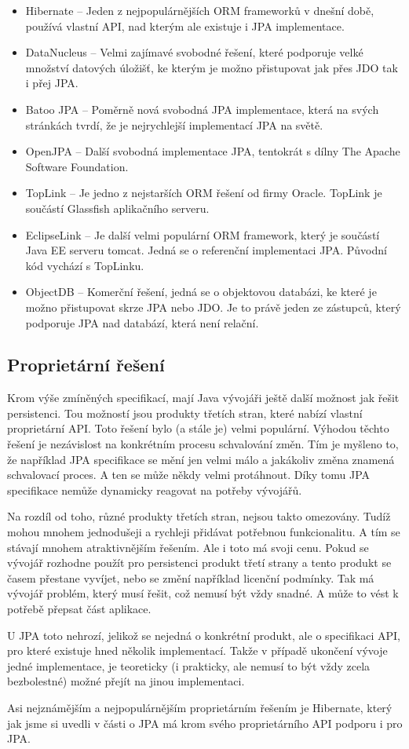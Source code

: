 \begin{itemize}
  \item Hibernate -- Jeden z nejpopulárnějších ORM frameworků v dnešní době, používá vlastní API, nad kterým ale existuje i JPA implementace.
  \item DataNucleus -- Velmi zajímavé svobodné řešení, které podporuje velké množství datových úložišť, ke kterým je možno přistupovat jak přes JDO tak i přej JPA.
  \item Batoo JPA -- Poměrně nová svobodná JPA implementace, která na svých stránkách tvrdí, že je nejrychlejší implementací JPA na světě.
  \item OpenJPA -- Další svobodná implementace JPA, tentokrát s dílny The Apache Software Foundation.
  \item TopLink -- Je jedno z nejstarších ORM řešení od firmy Oracle. TopLink je součástí Glassfish aplikačního serveru.
  \item EclipseLink -- Je další velmi populární ORM framework, který je součástí Java EE serveru tomcat. Jedná se o referenční implementaci JPA. Původní kód vychází s TopLinku.
  \item ObjectDB -- Komerční řešení, jedná se o objektovou databázi, ke které je možno přistupovat skrze JPA nebo JDO. Je to právě jeden ze zástupců, který podporuje JPA nad databází, která není relační.
\end{itemize}

\subsection{Proprietární řešení}
Krom výše zmíněných specifikací, mají Java vývojáři ještě další možnost jak řešit persistenci. Tou možností jsou produkty třetích stran, které nabízí vlastní proprietární API. Toto řešení bylo (a stále je) velmi populární. Výhodou těchto řešení je nezávislost na konkrétním procesu schvalování změn. Tím je myšleno to, že například JPA specifikace se mění jen velmi málo a jakákoliv změna znamená schvalovací proces. A ten se může někdy velmi protáhnout. Díky tomu JPA specifikace nemůže dynamicky reagovat na potřeby vývojářů.

Na rozdíl od toho, různé produkty třetích stran, nejsou takto omezovány. Tudíž mohou mnohem jednodušeji a rychleji přidávat potřebnou funkcionalitu. A tím se stávají mnohem atraktivnějším řešením. Ale i toto má svoji cenu. Pokud se vývojář rozhodne použít pro persistenci produkt třetí strany a tento produkt se časem přestane vyvíjet, nebo se změní například licenční podmínky. Tak má vývojář problém, který musí řešit, což nemusí být vždy snadné. A může to vést k potřebě přepsat část aplikace.

U JPA toto nehrozí, jelikož se nejedná o konkrétní produkt, ale o specifikaci API, pro které existuje hned několik implementací. Takže v případě ukončení vývoje jedné implementace, je teoreticky (i prakticky, ale nemusí to být vždy zcela bezbolestné) možné přejít na jinou implementaci.

Asi nejznámějším a nejpopulárnějším proprietárním řešením je Hibernate, který jak jsme si uvedli v části o JPA má krom svého proprietárního API podporu i pro JPA.
